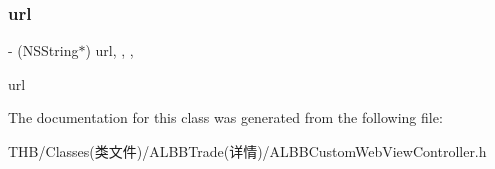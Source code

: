 \subsubsection{\texorpdfstring{url}{url}}
{\footnotesize\ttfamily -\/ (N\+S\+String$\ast$) url\hspace{0.3cm}{\ttfamily [read]}, {\ttfamily [write]}, {\ttfamily [nonatomic]}, {\ttfamily [copy]}}

url 

The documentation for this class was generated from the following file\+:\begin{DoxyCompactItemize}
\item 
T\+H\+B/\+Classes(类文件)/\+A\+L\+B\+B\+Trade(详情)/A\+L\+B\+B\+Custom\+Web\+View\+Controller.\+h\end{DoxyCompactItemize}
